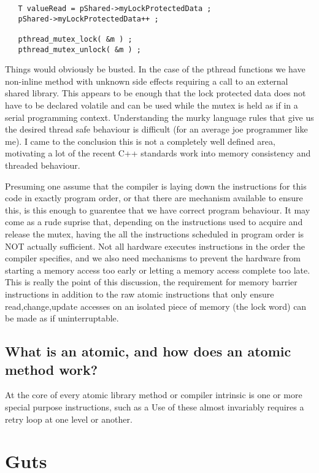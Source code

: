 \begin{lstlisting}
   T valueRead = pShared->myLockProtectedData ;
   pShared->myLockProtectedData++ ;

   pthread_mutex_lock( &m ) ;
   pthread_mutex_unlock( &m ) ;
\end{lstlisting}

Things would obviously be busted.  In the case of the pthread functions we have non-inline method with unknown side effects requiring a call to an external shared library.  This appears to be enough that the lock protected data does not have to be declared volatile and can be used while the mutex is held as if in a serial programming context.  Understanding the murky language rules that give us the desired thread safe behaviour is difficult (for an average joe programmer like me).  I came to the conclusion this is not a completely well defined area, motivating a lot of the recent C++ standards work into memory consistency and threaded behaviour.

Presuming one assume that the compiler is laying down the instructions for this code in exactly program order, or that there are mechanism available to ensure this, is this enough to guarentee that we have correct program behaviour.  It may come as a rude suprise that, depending on the instructions used to acquire and release the mutex, having the all the instructions scheduled in program order is NOT actually sufficient.  Not all hardware executes instructions in the order the compiler specifies, and we also need mechanisms to prevent the hardware from starting a memory access too early or letting a memory access complete too late.  This is really the point of this discussion, the requirement for memory barrier instructions in addition to the raw atomic instructions that only ensure read,change,update accesses on an isolated piece of memory (the lock word) can be made as if uninterruptable.

\subsection{What is an atomic, and how does an atomic method work?}

At the core of every atomic library method or compiler intrinsic is one or more special purpose instructions, such as a 
Use of these almost invariably requires a retry loop at one level or another.

\section{Guts}

